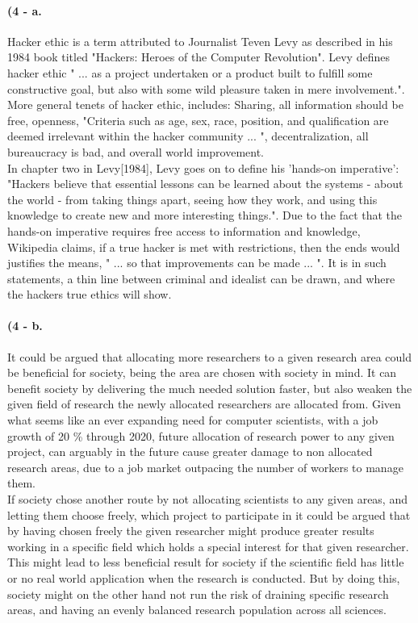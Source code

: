 \documentclass[paper=a4, fontsize=12pt]{scrartcl} %
\numberwithin{equation}{section} %
\numberwithin{figure}{section} %
\numberwithin{table}{section} %
\begin{document}
	\paragraph{(4 - a.}
	
	Hacker ethic is a term attributed to Journalist Teven Levy as described in his 1984 book titled "Hackers: Heroes of the Computer Revolution"\cite{HEM}. Levy defines hacker ethic " ... as a project undertaken or a product built to fulfill some constructive goal, but also with some wild pleasure taken in mere involvement."\cite{HEM}. More general tenets of hacker ethic, includes: Sharing, all information should be free, openness, "Criteria such as age, sex, race, position, and qualification are deemed irrelevant within the hacker community ... "\cite{HE1}, decentralization, all bureaucracy is bad, and overall world improvement. \\ 
	In chapter two in Levy[1984], Levy goes on to define his 'hands-on imperative': "Hackers believe that essential lessons can be learned about the systems - about the world - from taking things apart, seeing how they work, and using this knowledge to create new and more interesting things."\cite{HE12}. Due to the fact that the hands-on imperative requires free access to information and knowledge, Wikipedia claims, if a true hacker is met with restrictions, then the ends would justifies the means, " ... so that improvements can be made ... "\cite{HE12}. It is in such statements, a thin line between criminal and idealist can be drawn, and where the hackers true ethics will show.
	
	\paragraph{(4 - b.}
	
	It could be argued that allocating more researchers to a given research area could be beneficial for  society, being the area are chosen with society in mind. It can benefit society by delivering the much needed solution faster, but also weaken the given field of research the newly allocated researchers are allocated from. Given what seems like an ever expanding need for computer scientists, with a job growth of 20 \% through 2020\cite{CW}, future allocation of research power to any given project, can arguably in the future cause greater damage to non allocated research areas, due to a job market outpacing the number of workers to manage them. \\
	If society chose another route by not allocating scientists to any given areas, and letting them choose freely, which project to participate in it could be argued that by having chosen freely the given researcher might produce greater results working in a specific field which holds a special interest for that given researcher. This might lead to less beneficial result for society if the scientific field has little or no real world application when the research is conducted. But by doing this, society might on the other hand not run the risk of draining specific research areas, and having an evenly balanced research population across all sciences.
	
\end{document}
